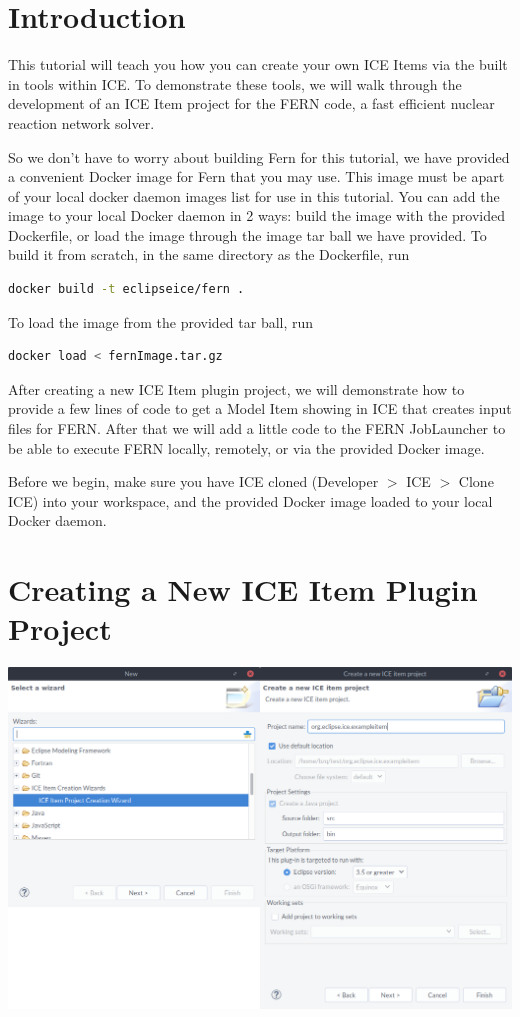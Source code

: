 \documentclass{article}
\begin{document}
\section{Introduction} 

This tutorial will teach you how you
can create your own ICE Items via the built in tools within ICE.  To demonstrate
these tools, we will walk through the development of an ICE Item project for the
FERN code, a fast efficient nuclear reaction network solver. 

So we don't have to worry about building Fern for this tutorial, we have
provided a convenient Docker image for Fern that you may use.  
This image must be apart of your local docker daemon images list for use in this
tutorial. You can add the image to your local Docker daemon in 2 ways: build the
image with the provided Dockerfile, or load the image through the image tar ball we have provided. To
build it from scratch, in the same directory as the Dockerfile, run 
\begin{lstlisting}[language=bash,caption={bash version}]
docker build -t eclipseice/fern .
\end{lstlisting}
To load the image from the provided tar ball, run 
\begin{lstlisting}[language=bash,caption={bash version}]
docker load < fernImage.tar.gz
\end{lstlisting}

After creating a new ICE Item plugin project, we will demonstrate how to
provide a few lines of code to get a Model Item showing in ICE that creates
input files for FERN. After that we will add a little code to the FERN
JobLauncher to be able to execute FERN locally, remotely, or via the
provided Docker image. 

Before we begin, make sure you have ICE cloned (Developer $>$ ICE $>$ Clone ICE)
into your workspace, and the provided Docker image loaded to your local Docker daemon. 

\section{Creating a New ICE Item Plugin Project}
\begin{center} \includegraphics[width=\textwidth]{figures/comb12} \end{center}
\end{document}
